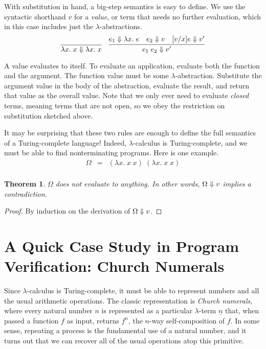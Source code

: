 \documentclass{amsbook}
\newtheorem{theorem}{Theorem}[chapter]
\theoremstyle{definition}
\theoremstyle{remark}
\numberwithin{section}{chapter}
\numberwithin{equation}{chapter}
\begin{document}
With substitution in hand, a big-step semantics is easy to define.
We use the syntactic shorthand $v$ for a \emph{value}, or term that needs no further evaluation, which in this case includes just the $\lambda$-abstractions.
\encoding
$$\infer{\bigstep{\lambda x. \; x}{\lambda x. \; x}}{}
\quad \infer{\bigstep{e_1 \; e_2}{v'}}{
  \bigstep{e_1}{\lambda x. \; e}
  & \bigstep{e_2}{v}
  & \bigstep{\subst{e}{x}{v}}{v'}
}$$

A value evaluates to itself.
To evaluate an application, evaluate both the function and the argument.
The function value must be some $\lambda$-abstraction.
Substitute the argument value in the body of the abstraction, evaluate the result, and return that value as the overall value.
Note that we only ever need to evaluate \emph{closed} terms, meaning terms that are not open, so we obey the restriction on substitution sketched above.

It may be surprising that these two rules are enough to define the full semantics of a Turing-complete language!
Indeed, $\lambda$-calculus is Turing-complete, and we must be able to find nonterminating programs.
Here is one example.
\begin{eqnarray*}
  \Omega &=& (\lambda x. \; x \; x) \; (\lambda x. \; x \; x) \\
\end{eqnarray*}
\begin{theorem}
  $\Omega$ does not evaluate to anything.  In other words, $\Omega \Downarrow v$ implies a contradiction.
\end{theorem}
\begin{proof}
  By induction on the derivation of $\Omega \Downarrow v$.
\end{proof}


\section{A Quick Case Study in Program Verification: Church Numerals}

\newcommand{\church}[1]{\underline{#1}}

Since $\lambda$-calculus is Turing-complete, it must be able to represent numbers and all the usual arithmetic operations.
The classic representation is \emph{Church numerals}, where every natural number $n$ is represented as a particular $\lambda$-term $\church{n}$ that, when passed a function $f$ as input, returns $f^n$, the $n$-way self-composition of $f$.
In some sense, repeating a process is the fundamental use of a natural number, and it turns out that we can recover all of the usual operations atop this primitive.
\end{document}
